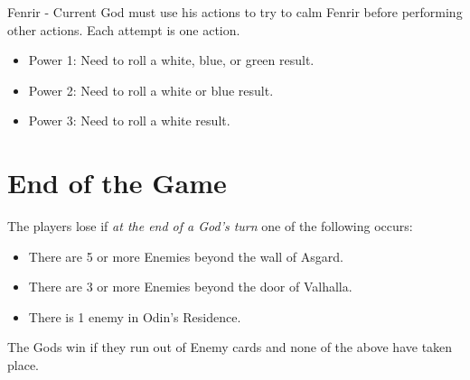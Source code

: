 \documentclass[12pt]{article}
\newenvironment{itemizeCustom}
{\begin{itemize}
  \setlength{\itemsep}{1pt}
  \setlength{\parskip}{0pt}
  \setlength{\parsep}{0pt}}
{\end{itemize}}
\begin{document}
\begin{multicols*}{2}
\noindent
Fenrir - Current God must use his actions to try to calm Fenrir before performing other actions. Each attempt is one action.
\begin{itemizeCustom}
	\item Power 1: Need to roll a white, blue, or green result.
	\item Power 2: Need to roll a white or blue result.
	\item Power 3: Need to roll a white result.
\end{itemizeCustom}

\section*{End of the Game}
The players lose if \emph{at the end of a God's turn} one of the following occurs:
\begin{itemizeCustom}
	\item There are 5 or more Enemies beyond the wall of Asgard.
	\item There are 3 or more Enemies beyond the door of Valhalla.
	\item There is 1 enemy in Odin's Residence.
\end{itemizeCustom}

\noindent
The Gods win if they run out of Enemy cards and none of the above have taken place.

\end{multicols*}
\end{document}
